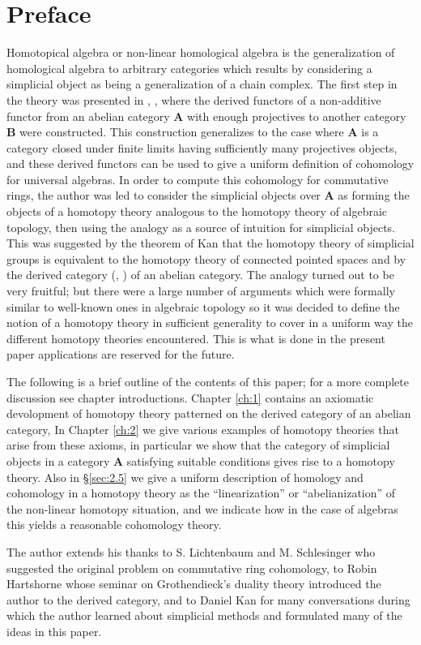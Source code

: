 \documentclass[../main]{subfiles}
\begin{document}
\chapter*{Preface}

Homotopical algebra or non-linear homological algebra is the
generalization of homological algebra to arbitrary categories
which results by considering a simplicial object as being a generalization of a chain complex. The first step in the theory was presented in \cite{dold_homology_1958}, \cite{dold_homologie_1961}, where the derived functors of a non-additive functor from an abelian category $\mathbf{A}$ with enough projectives to another category $\mathbf{B}$ were constructed. This construction generalizes to the case where $\mathbf{A}$ is a category closed under finite limits having sufficiently many projectives objects, and these derived functors can be used to give a uniform definition of cohomology for universal algebras. In order to compute this cohomology for commutative rings, the author was led to consider the
simplicial objects over $\mathbf{A}$ as forming the objects of a homotopy
theory analogous to the homotopy theory of algebraic topology,
then using the analogy as a source of intuition for simplicial
objects. This was suggested by the theorem of Kan \cite{kan_homotopy_1958} that the
homotopy theory of simplicial groups is equivalent to the homotopy theory of connected pointed spaces and by the derived category (\cite{hartshorne_residues_1966}, \cite{verdier_categories_nodate}) of an abelian category. The analogy turned out
to be very fruitful; but there were a large number of arguments which were formally similar to well-known ones in algebraic topology so it was decided to define the notion of a homotopy theory
in sufficient generality to cover in a uniform way the different
homotopy theories encountered. This is what is done in the present paper applications are reserved for the future. 

The following is a brief outline of the contents of this paper; for a more complete discussion see chapter introductions. Chapter \ref{ch:1} contains an axiomatic devolopment of homotopy theory patterned on the derived category of an abelian category, In Chapter \ref{ch:2} we
give various examples of homotopy theories that arise from these
axioms, in particular we show that the category of simplicial objects in a category $\mathbf{A}$ satisfying suitable conditions gives rise
to a homotopy theory. Also in \S\ref{sec:2.5} we give a uniform description
of homology and cohomology in a homotopy theory as the ``linearization'' or ``abelianization'' of the non-linear homotopy situation,
and we indicate how in the case of algebras this yields a reasonable cohomology theory.

The author extends his thanks to S. Lichtenbaum and
M. Schlesinger who suggested the original problem on commutative
ring cohomology, to Robin Hartshorne whose seminar \cite{hartshorne_residues_1966} on
Grothendieck's duality theory introduced the author to the derived
category, and to Daniel Kan for many conversations during which
the author learned about simplicial methods and formulated many
of the ideas in this paper.
\end{document}
